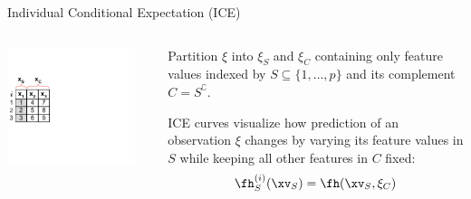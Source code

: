 \documentclass[11pt,compress,t,notes=noshow, aspectratio=169, xcolor=table]{beamer}
\begin{document}
\begin{frame}{Individual Conditional Expectation (ICE)}

\begin{columns}[T]
\begin{column}{0.18\textwidth} %
\includegraphics[page=1, trim=0cm 0.35cm 4.53cm 0.35cm, clip, width=0.9\textwidth]{figure_man/ice_plot_demo}
\end{column}
\begin{column}{0.82\textwidth}
Partition $\xi$ into $\xi_S$ and $\xi_C$ containing only feature values indexed by $S \subseteq \{1, \dots, p\}$ and its complement $C = S^\complement$.
\lz

ICE curves visualize how prediction of an observation $\xi$ changes by varying its feature values in $S$ while keeping all other features in $C$ fixed:
$$\fh_{S}^{(i)}(\xv_S) = \fh(\xv_S, \xi_C)$$


\end{column}
\end{columns}
\end{frame}
\end{document}
